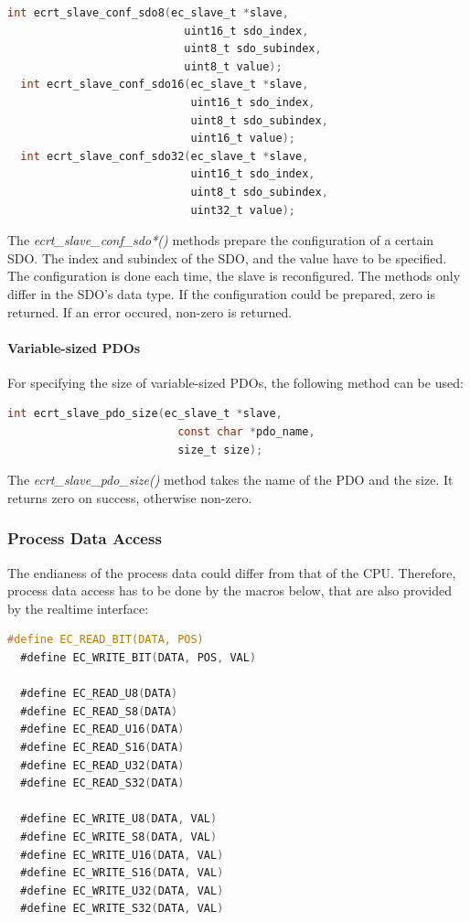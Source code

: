 \documentclass[a4paper,12pt,BCOR6mm,bibtotoc,idxtotoc]{scrbook}
\begin{document}
\begin{lstlisting}[language=C]
  int ecrt_slave_conf_sdo8(ec_slave_t *slave,
                           uint16_t sdo_index,
                           uint8_t sdo_subindex,
                           uint8_t value);
  int ecrt_slave_conf_sdo16(ec_slave_t *slave,
                            uint16_t sdo_index,
                            uint8_t sdo_subindex,
                            uint16_t value);
  int ecrt_slave_conf_sdo32(ec_slave_t *slave,
                            uint16_t sdo_index,
                            uint8_t sdo_subindex,
                            uint32_t value);
\end{lstlisting}

The \textit{ecrt\_slave\_conf\_sdo*()} methods prepare the
configuration of a certain SDO. The index and subindex of the SDO, and
the value have to be specified. The configuration is done each time,
the slave is reconfigured. The methods only differ in the SDO's data
type. If the configuration could be prepared, zero is returned. If an
error occured, non-zero is returned.

\paragraph{Variable-sized PDOs}

For specifying the size of variable-sized PDOs, the following method
can be used:

\begin{lstlisting}[language=C]
  int ecrt_slave_pdo_size(ec_slave_t *slave,
                          const char *pdo_name,
                          size_t size);
\end{lstlisting}

The \textit{ecrt\_slave\_pdo\_size()} method takes the name of the PDO
and the size. It returns zero on success, otherwise non-zero.

\subsubsection{Process Data Access}
\label{sec:macros}

The endianess of the process data could differ from that of the CPU.
Therefore, process data access has to be done by the macros below,
that are also provided by the realtime interface:

\begin{lstlisting}[language=C]
  #define EC_READ_BIT(DATA, POS)
  #define EC_WRITE_BIT(DATA, POS, VAL)

  #define EC_READ_U8(DATA)
  #define EC_READ_S8(DATA)
  #define EC_READ_U16(DATA)
  #define EC_READ_S16(DATA)
  #define EC_READ_U32(DATA)
  #define EC_READ_S32(DATA)

  #define EC_WRITE_U8(DATA, VAL)
  #define EC_WRITE_S8(DATA, VAL)
  #define EC_WRITE_U16(DATA, VAL)
  #define EC_WRITE_S16(DATA, VAL)
  #define EC_WRITE_U32(DATA, VAL)
  #define EC_WRITE_S32(DATA, VAL)
\end{lstlisting}
\end{document}

